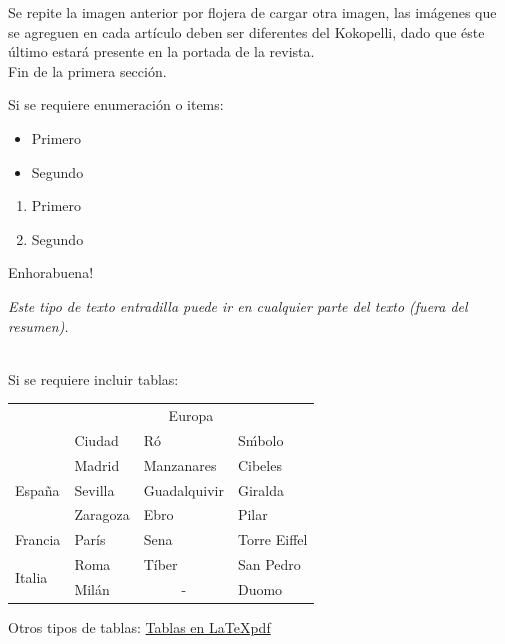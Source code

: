 \begin{multicols}{2}
Se repite la imagen anterior por flojera de cargar otra imagen, las imágenes que se agreguen en cada artículo deben ser diferentes del Kokopelli, dado que éste último estará presente en la portada de la revista. \\ 

Fin de la primera sección.



Si se requiere enumeración o items:
\begin{itemize}
    \item Primero
    \item Segundo
\end{itemize}

\begin{enumerate}
    \item Primero
    \item Segundo
\end{enumerate}

Enhorabuena! 


\begin{entradilla}
{\em Este tipo de texto entradilla {\color{introcolor}{ (así se define en el código) }} 
  puede ir en cualquier parte del texto (fuera del resumen).}
\end{entradilla}

\\
Si se requiere incluir tablas:
\medskip


\begin{tabular}{|l|l|l|l|}
    \hline
    & \multicolumn{3}{c|}{Europa} \\
    \cline{2-4}
    & Ciudad & Ró & S\'mbolo\\
    \hline \hline
    \multirow{3}{1cm}{España} & Madrid & Manzanares & Cibeles\\ \cline{2-4}
    & Sevilla & Guadalquivir & Giralda\\ \cline{2-4}
    & Zaragoza & Ebro & Pilar\\ \cline{1-4}
    Francia & París & Sena & Torre Eiffel\\ \cline{1-4}
    \multirow{2}{1cm}{Italia} & Roma & Tíber & San Pedro\\ \cline{2-4}
    & Milán & \multicolumn{1}{c|}{-} & Duomo\\ \cline{1-4}
\end{tabular}

\medskip

Otros tipos de tablas:
\href{https://latexlive.files.wordpress.com/2009/04/tablas.pdf}{Tablas en \LaTeX pdf} \\



\end{multicols}
